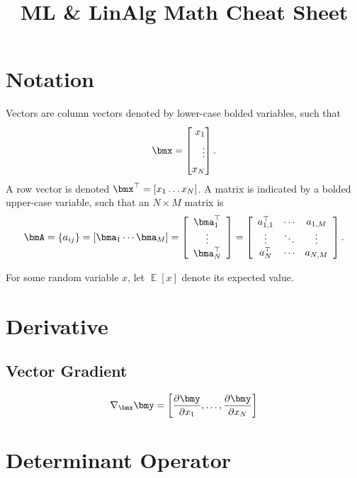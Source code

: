 \documentclass[11pt]{article}
\title{ML \& LinAlg Math Cheat Sheet}
\DeclareMathOperator{\E}{\mathbb{E}}
\begin{document}
\maketitle
\tableofcontents

\pagebreak
\section{Notation}
Vectors are column vectors denoted by lower-case bolded variables, such that 
\[\bmx = \left[ \begin{split}
x_1 \\ \vdots \\ x_N 
\end{split} \right]. \]
A row vector is denoted $\bmx^\top = [x_1 \ldots x_N]$.
A matrix is indicated by a bolded upper-case variable, such that an $N \times M$ matrix is
\begin{align*}
\bmA = \{a_{ij}\} = [\bma_1 \cdots \bma_M ] =
\left[\begin{array}{c}
\bma_1^\top \\
\vdots \\
\bma_N^\top
\end{array}\right]
=
\left[\begin{array}{ccc}
a_{1,1}^\top & \cdots & a_{1, M} \\
\vdots & \ddots & \vdots \\
a_N^\top & \cdots & a_{N, M}
\end{array}\right].
\end{align*}

For some random variable $x$, let $\E[x]$ denote its expected value.





\section{Derivative}
\subsection{Vector Gradient}
\begin{equation}
\nabla_{\bmx} \bmy =
\left[
	\frac{\partial \bmy}{\partial x_1}, \ldots, \frac{\partial \bmy}{\partial x_N}
\right]
\label{eq:Derivative-random_vector}
\end{equation}






\section{Determinant Operator}
\end{document}
